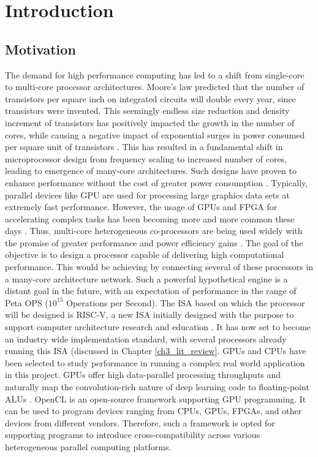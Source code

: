 \chapter{Introduction}
\label{ch1_introduction}
\section{Motivation}
\label{sect1_1}

The demand for high performance computing has led to a shift from single-core to multi-core processor architectures. Moore's law predicted that the number of transistors per square inch on integrated circuits will double every year, since transistors were invented. This seemingly endless size reduction and density increment of transistors has positively impacted the growth in the number of cores, while causing a negative impact of exponential surges in power consumed per square unit of transistors \cite{mimerschedval2015}. This has resulted in a fundamental shift in microprocessor design from frequency scaling to increased number of cores, leading to emergence of many-core architectures. Such designs have proven to enhance performance without the cost of greater power consumption \cite{intel2010}. \newline\newline
Typically, parallel devices like \ac{GPU} are used for processing large graphics data sets at extremely fast performance. However, the usage of GPUs and \ac{FPGA} for accelerating complex tasks has been becoming more and more common these days \cite{acm2004} \cite{vlsi2005}. Thus, multi-core heterogeneous co-processors are being used widely with the promise of greater performance and power efficiency gains \cite{acmsurvery2015}.\newline\newline
The goal of the objective is to design a processor capable of delivering high computational performance. This would be achieving by connecting several of these processors in a many-core architecture network. Such a powerful hypothetical engine is a distant goal in the future, with an expectation of performance in the range of Peta OPS ($10^15$ Operations per Second). The \ac{ISA} based on which the processor will be designed is RISC-V, a new ISA initially designed with the purpose to support computer architecture research and education \cite{riscv_home}. It has now set to become an industry wide implementation standard, with several processors already running this ISA (discussed in Chapter \ref{ch3_lit_review}.\newline\newline
GPUs and CPUs have been selected to study performance in running a complex real world application in this project. GPUs offer high data-parallel processing throughputs and naturally map the convolution-rich nature of deep learning code to floating-point ALUs \cite{caffe2016}. OpenCL is an open-source framework supporting GPU programming. It can be used to program devices ranging from CPUs, GPUs, FPGAs, and other devices from different vendors. Therefore, such a framework is opted for supporting programs to introduce cross-compatibility across various heterogeneous parallel computing platforms.

